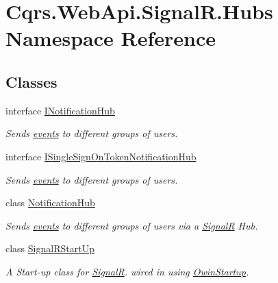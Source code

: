 \hypertarget{namespaceCqrs_1_1WebApi_1_1SignalR_1_1Hubs}{}\section{Cqrs.\+Web\+Api.\+Signal\+R.\+Hubs Namespace Reference}
\label{namespaceCqrs_1_1WebApi_1_1SignalR_1_1Hubs}
\subsection*{Classes}
\begin{DoxyCompactItemize}
\item 
interface \hyperlink{interfaceCqrs_1_1WebApi_1_1SignalR_1_1Hubs_1_1INotificationHub}{I\+Notification\+Hub}
\begin{DoxyCompactList}\small\item\em Sends \hyperlink{}{events} to different groups of users. \end{DoxyCompactList}\item 
interface \hyperlink{interfaceCqrs_1_1WebApi_1_1SignalR_1_1Hubs_1_1ISingleSignOnTokenNotificationHub}{I\+Single\+Sign\+On\+Token\+Notification\+Hub}
\begin{DoxyCompactList}\small\item\em Sends \hyperlink{}{events} to different groups of users. \end{DoxyCompactList}\item 
class \hyperlink{classCqrs_1_1WebApi_1_1SignalR_1_1Hubs_1_1NotificationHub}{Notification\+Hub}
\begin{DoxyCompactList}\small\item\em Sends \hyperlink{}{events} to different groups of users via a \hyperlink{namespaceCqrs_1_1WebApi_1_1SignalR}{SignalR} Hub. \end{DoxyCompactList}\item 
class \hyperlink{classCqrs_1_1WebApi_1_1SignalR_1_1Hubs_1_1SignalRStartUp}{Signal\+R\+Start\+Up}
\begin{DoxyCompactList}\small\item\em A Start-\/up class for \hyperlink{namespaceCqrs_1_1WebApi_1_1SignalR}{SignalR}. wired in using \hyperlink{}{Owin\+Startup}. \end{DoxyCompactList}\end{DoxyCompactItemize}
